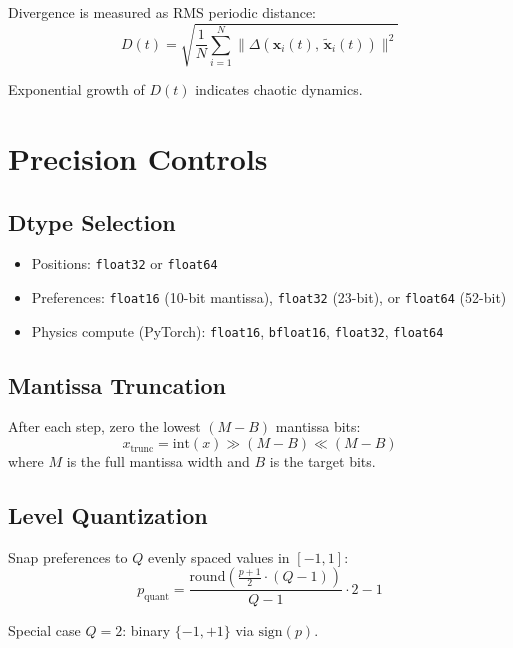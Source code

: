 \documentclass[11pt,a4paper]{article}
\begin{document}
Divergence is measured as RMS periodic distance:
\begin{equation}
D(t) = \sqrt{\frac{1}{N} \sum_{i=1}^{N} \|\Delta(\mathbf{x}_i(t),\, \tilde{\mathbf{x}}_i(t))\|^2}
\end{equation}

Exponential growth of $D(t)$ indicates chaotic dynamics.

\section{Precision Controls}

\subsection{Dtype Selection}
\begin{itemize}[nosep]
\item Positions: \texttt{float32} or \texttt{float64}
\item Preferences: \texttt{float16} (10-bit mantissa), \texttt{float32} (23-bit), or \texttt{float64} (52-bit)
\item Physics compute (PyTorch): \texttt{float16}, \texttt{bfloat16}, \texttt{float32}, \texttt{float64}
\end{itemize}

\subsection{Mantissa Truncation}

After each step, zero the lowest $(M - B)$ mantissa bits:
\begin{equation}
x_{\mathrm{trunc}} = \mathrm{int}(x) \gg (M - B) \ll (M - B)
\end{equation}
where $M$ is the full mantissa width and $B$ is the target bits.

\subsection{Level Quantization}

Snap preferences to $Q$ evenly spaced values in $[-1, 1]$:
\begin{equation}
p_{\mathrm{quant}} = \frac{\mathrm{round}\!\left(\frac{p + 1}{2} \cdot (Q - 1)\right)}{Q - 1} \cdot 2 - 1
\end{equation}

Special case $Q = 2$: binary $\{-1, +1\}$ via $\mathrm{sign}(p)$.
\end{document}
